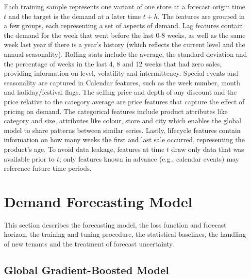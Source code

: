 \documentclass{StockSense}
\begin{document}
Each training sample represents one variant of one store at a forecast origin time $t$ and the target is the demand at a later time $t+h$. The features are grouped in a few groups, each representing a set of aspects of demand. Lag features contain the demand for the week that went before the last 0-8 weeks, as well as the same week last year if there is a year's history (which reflects the current level and the annual seasonality). Rolling stats include the average, the standard deviation and the percentage of weeks in the last 4, 8 and 12 weeks that had zero sales, providing information on level, volatility and intermittency. Special events and seasonality are captured in Calendar features, such as the week number, month and holiday/festival flags. The selling price and depth of any discount and the price relative to the category average are price features that capture the effect of pricing on demand. The categorical features include product attributes like category and size, attributes like colour, store and city which enables the global model to share patterns between similar series. Lastly, lifecycle features contain information on how many weeks the first and last sale occurred, representing the product's age. To avoid data leakage, features at time $t$ draw only data that was available prior to $t$; only features known in advance (e.g., calendar events) may reference future time periods.

\section{Demand Forecasting Model}
\label{sec:forecasting}

This section describes the forecasting model, the loss function and forecast horizon, the training and tuning procedure, the statistical baselines, the handling of new tenants and the treatment of forecast uncertainty.

\subsection{Global Gradient-Boosted Model}
\end{document}
